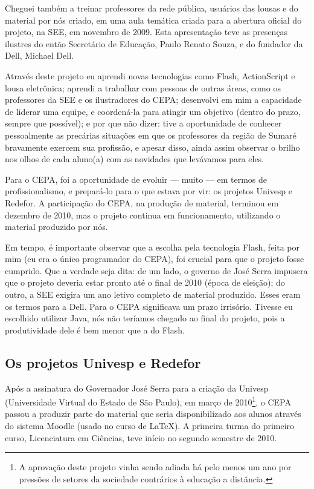 Cheguei também a treinar professores da rede pública, usuários das lousas e do material por nós criado, em uma aula temática criada para a abertura oficial do projeto, na SEE, em novembro de 2009. Esta apresentação teve as presenças ilustres do então Secretário de Educação, Paulo Renato Souza, e do fundador da Dell, Michael Dell.

Através deste projeto eu aprendi novas tecnologias como Flash, ActionScript e lousa eletrônica; aprendi a trabalhar com pessoas de outras áreas, como os professores da SEE e os ilustradores do CEPA; desenvolvi em mim a capacidade de liderar uma equipe, e coordená-la para atingir um objetivo (dentro do prazo, sempre que possível); e por que não dizer: tive a oportunidade de conhecer pessoalmente as precárias situações em que os professores da região de Sumaré bravamente exercem sua profissão, e apesar disso, ainda assim observar o brilho nos olhos de cada aluno(a) com as novidades que levávamos para eles.

Para o CEPA, foi a oportunidade de evoluir --- muito --- em termos de profissionalismo, e prepará-lo para o que estava por vir: os projetos Univesp e Redefor. A participação do CEPA, na produção de material, terminou em dezembro de 2010, mas o projeto continua em funcionamento, utilizando o material produzido por nós.

Em tempo, é importante observar que a escolha pela tecnologia Flash, feita por mim (eu era o único programador do CEPA), foi crucial para que o projeto fosse cumprido. Que a verdade seja dita: de um lado, o governo de José Serra impusera que o projeto deveria estar pronto até o final de 2010 (época de eleição); do outro, a SEE exigira um ano letivo completo de material produzido. Esses eram os termos para a Dell. Para o CEPA significava um prazo irrisório. Tivesse eu escolhido utilizar Java, nós não teríamos chegado ao final do projeto, pois a produtividade dele é bem menor que a do Flash.

\subsection{Os projetos Univesp e Redefor}

Após a assinatura do Governador José Serra para a criação da Univesp (Universidade Virtual do Estado de São Paulo), em março de 2010\footnote{A aprovação deste projeto vinha sendo adiada há pelo menos um ano por pressões de setores da sociedade contrários à educação a distância.}, o CEPA passou a produzir parte do material que seria disponibilizado aos alunos através do sistema Moodle (usado no curso de \LaTeX). A primeira turma do primeiro curso, Licenciatura em Ciências, teve início no segundo semestre de 2010.

